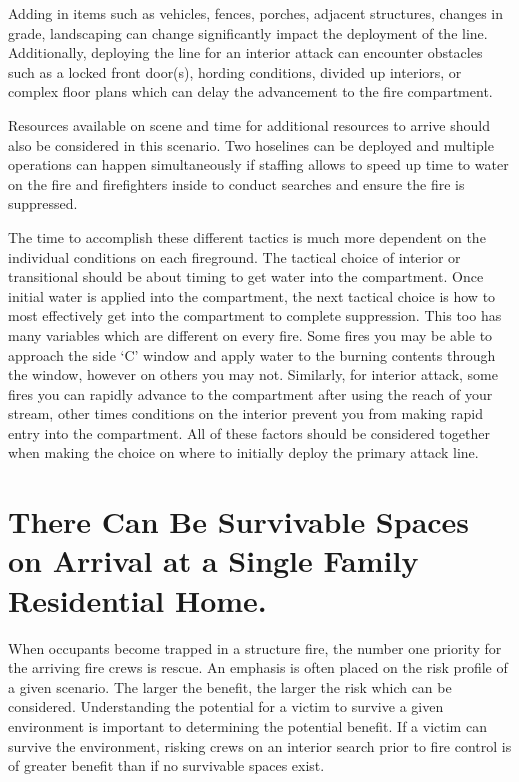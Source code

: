 \documentclass[12pt,oneside]{book}
\begin{document}
Adding in items such as vehicles, fences, porches, adjacent structures, changes in grade, landscaping can change significantly impact the deployment of the line. Additionally, deploying the line for an interior attack can encounter obstacles such as a locked front door(s), hording conditions, divided up interiors, or complex floor plans which can delay the advancement to the fire compartment. 

Resources available on scene and time for additional resources to arrive should also be considered in this scenario. Two hoselines can be deployed and multiple operations can happen simultaneously if staffing allows to speed up time to water on the fire and firefighters inside to conduct searches and ensure the fire is suppressed.

The time to accomplish these different tactics is much more dependent on the individual conditions on each fireground. The tactical choice of interior or transitional should be about timing to get water into the compartment. Once initial water is applied into the compartment, the next tactical choice is how to most effectively get into the compartment to complete suppression. This too has many variables which are different on every fire. Some fires you may be able to approach the side `C' window and apply water to the burning contents through the window, however on others you may not. Similarly, for interior attack, some fires you can rapidly advance to the compartment after using the reach of your stream, other times conditions on the interior prevent you from making rapid entry into the compartment. All of these factors should be considered together when making the choice on where to initially deploy the primary attack line. 

\section{There Can Be Survivable Spaces on Arrival at a Single Family Residential Home.} \label{tc:survivable_spaces}
When occupants become trapped in a structure fire, the number one priority for the arriving fire crews is rescue. An emphasis is often placed on the risk profile of a given scenario. The larger the benefit, the larger the risk which can be considered. Understanding the potential for a victim to survive a given environment is important to determining the potential benefit. If a victim can survive the environment, risking crews on an interior search prior to fire control is of greater benefit than if no survivable spaces exist. 
\end{document}
